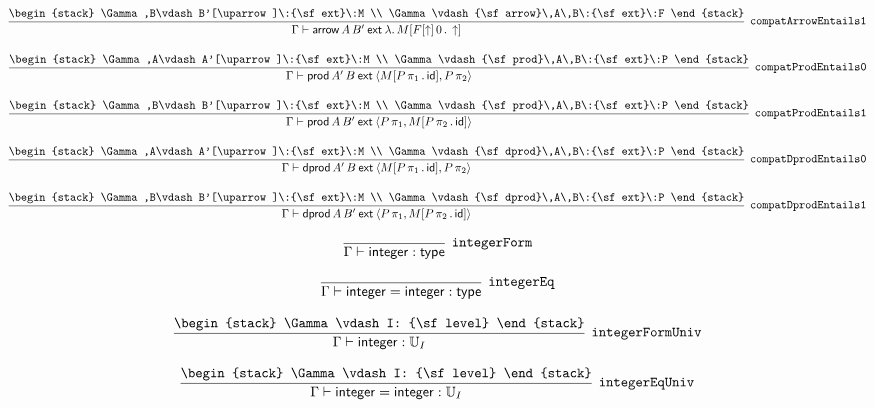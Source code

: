 \[
\infer[{\tt compatArrowEntails1}]{\Gamma \vdash {\sf arrow}\,A\,B'\:{\sf ext}\:\lambda .\,M[F[\uparrow ]\,0\,.\,\uparrow ]}{
\begin{stack}
\Gamma ,B\vdash B'[\uparrow ]\:{\sf ext}\:M
\\
\Gamma \vdash {\sf arrow}\,A\,B\:{\sf ext}\:F
\end{stack}}
\]

\[
\infer[{\tt compatProdEntails0}]{\Gamma \vdash {\sf prod}\,A'\,B\:{\sf ext}\:\langle M[P\, \pi_1\,.\,{\sf id}],P\, \pi_2\rangle }{
\begin{stack}
\Gamma ,A\vdash A'[\uparrow ]\:{\sf ext}\:M
\\
\Gamma \vdash {\sf prod}\,A\,B\:{\sf ext}\:P
\end{stack}}
\]

\[
\infer[{\tt compatProdEntails1}]{\Gamma \vdash {\sf prod}\,A\,B'\:{\sf ext}\:\langle P\, \pi_1,M[P\, \pi_2\,.\,{\sf id}]\rangle }{
\begin{stack}
\Gamma ,B\vdash B'[\uparrow ]\:{\sf ext}\:M
\\
\Gamma \vdash {\sf prod}\,A\,B\:{\sf ext}\:P
\end{stack}}
\]

\[
\infer[{\tt compatDprodEntails0}]{\Gamma \vdash {\sf dprod}\,A'\,B\:{\sf ext}\:\langle M[P\, \pi_1\,.\,{\sf id}],P\, \pi_2\rangle }{
\begin{stack}
\Gamma ,A\vdash A'[\uparrow ]\:{\sf ext}\:M
\\
\Gamma \vdash {\sf dprod}\,A\,B\:{\sf ext}\:P
\end{stack}}
\]

\[
\infer[{\tt compatDprodEntails1}]{\Gamma \vdash {\sf dprod}\,A\,B'\:{\sf ext}\:\langle P\, \pi_1,M[P\, \pi_2\,.\,{\sf id}]\rangle }{
\begin{stack}
\Gamma ,B\vdash B'[\uparrow ]\:{\sf ext}\:M
\\
\Gamma \vdash {\sf dprod}\,A\,B\:{\sf ext}\:P
\end{stack}}
\]

\[
\infer[{\tt integerForm}]{\Gamma \vdash {\sf integer}: {\sf type}}{}
\]

\[
\infer[{\tt integerEq}]{\Gamma \vdash {\sf integer}= {\sf integer}: {\sf type}}{}
\]

\[
\infer[{\tt integerFormUniv}]{\Gamma \vdash {\sf integer}: {\Bbb U}_{I}}{
\begin{stack}
\Gamma \vdash I: {\sf level}
\end{stack}}
\]

\[
\infer[{\tt integerEqUniv}]{\Gamma \vdash {\sf integer}= {\sf integer}: {\Bbb U}_{I}}{
\begin{stack}
\Gamma \vdash I: {\sf level}
\end{stack}}
\]

